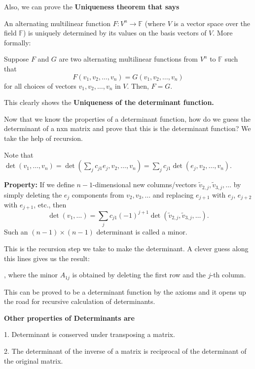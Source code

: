 Also, we can prove the \textbf{Uniqueness theorem that says}

\begin{outline}
    An alternating multilinear function $F: V^n \to \mathbb{F}$ (where $V$ is a vector space over the field $\mathbb{F}$) is uniquely determined by its values on the basis vectors of $V$. More formally:

Suppose $F$ and $G$ are two alternating multilinear functions from $V^n$ to $\mathbb{F}$ such that
\[F(v_1, v_2, \ldots, v_n) = G(v_1, v_2, \ldots, v_n)\]
for all choices of vectors $v_1, v_2, \ldots, v_n$ in $V$. Then, $F = G$.
\end{outline}

This clearly shows the \textbf{Uniqueness of the determinant function.}

Now that we know the properties of a determinant function, how do we guess the determinant of a nxn matrix and prove that this is the determinant function? We take the help of recursion. 

Note that $\det(v_1, \ldots, v_n) = \det\left(\sum_{j} c_{j1}e_j, v_2, \ldots, v_n\right) = \sum_{j} c_{j1}\det(e_j, v_2, \ldots, v_n)$.

\textbf{Property:} If we define $n - 1$-dimensional new columns/vectors $\tilde{v}_{2,j}, \tilde{v}_{3,j}, \ldots$ by simply deleting the $e_j$ components from $v_2, v_3, \ldots$ and replacing $e_{j+1}$ with $e_j$, $e_{j+2}$ with $e_{j+1}$, etc., then
\[
\det(v_1, \ldots) = \sum_j c_{j1}(-1)^{j+1} \det(\tilde{v}_{2,j}, \tilde{v}_{3,j}, \ldots).
\]
Such an $(n - 1) \times (n - 1)$ determinant is called a minor.

This is the recursion step we take to make the determinant. A clever guess along this lines gives us the result: 


, where the minor $A_{1j}$ is obtained by deleting the first row and the $j$-th column.

This can be proved to be a determinant function by the axioms and it opens up the road for recursive calculation of determinants.


\textbf{Other properties of Determinants are}

1. Determinant is conserved under transposing a matrix.

2. The determinant of the inverse of a matrix is reciprocal of the determinant of the original matrix.

